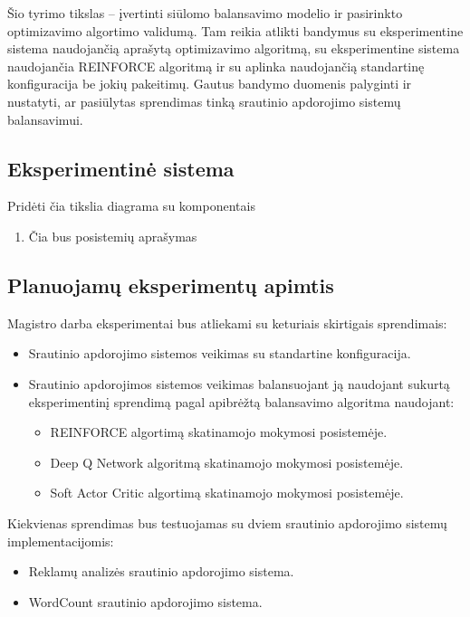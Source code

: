 \documentclass{VUMIFPSbakalaurinis}
\begin{document}
Šio tyrimo tikslas – įvertinti siūlomo balansavimo modelio ir pasirinkto optimizavimo algortimo validumą. Tam reikia atlikti bandymus su eksperimentine sistema naudojančią aprašytą optimizavimo algoritmą, su eksperimentine sistema naudojančia REINFORCE algoritmą ir su aplinka naudojančią standartinę konfiguracija be jokių pakeitimų. Gautus bandymo duomenis palyginti ir nustatyti, ar pasiūlytas sprendimas tinką srautinio apdorojimo sistemų balansavimui.

\subsection{Eksperimentinė sistema}

Pridėti čia tikslia diagrama su komponentais

\begin{enumerate}
    \item Čia bus posistemių aprašymas
\end{enumerate}

\subsection{Planuojamų eksperimentų apimtis}

Magistro darba eksperimentai bus atliekami su keturiais skirtigais sprendimais:
\begin{itemize}
    \item Srautinio apdorojimo sistemos veikimas su standartine konfiguracija.
    \item Srautinio apdorojimos sistemos veikimas balansuojant ją naudojant sukurtą eksperimentinį sprendimą pagal apibrėžtą balansavimo algoritma naudojant:
    \begin{itemize}
        \item REINFORCE algortimą skatinamojo mokymosi posistemėje.
        \item Deep Q Network algoritmą skatinamojo mokymosi posistemėje.
        \item Soft Actor Critic algortimą skatinamojo mokymosi posistemėje.
    \end{itemize}
\end{itemize}

Kiekvienas sprendimas bus testuojamas su dviem srautinio apdorojimo sistemų implementacijomis:
\begin{itemize}
    \item Reklamų analizės srautinio apdorojimo sistema.
    \item WordCount srautinio apdorojimo sistema.
\end{itemize}
\end{document}
